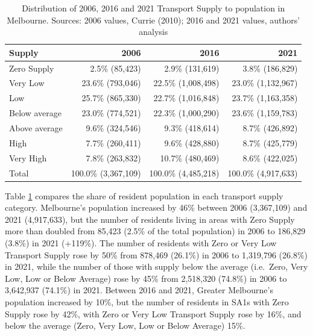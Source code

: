 \documentclass[preprint, 3p,
authoryear]{elsarticle} %
\begin{document}
\begin{table}

\caption{\label{tab:Greater_Melbourne_CCDs_SA1_population}Distribution of 2006, 2016 and 2021 Transport Supply to population in Melbourne. Sources: 2006 values, Currie (2010); 2016 and 2021 values, authors' analysis}
\centering
\begin{tabular}[t]{l|r|r|r}
\hline
Supply & 2006 & 2016 & 2021\\
\hline
Zero Supply & 2.5\%    (85,423) & 2.9\%   (131,619) & 3.8\%   (186,829)\\
\hline
Very Low & 23.6\%   (793,046) & 22.5\% (1,008,498) & 23.0\% (1,132,967)\\
\hline
Low & 25.7\%   (865,330) & 22.7\% (1,016,848) & 23.7\% (1,163,358)\\
\hline
Below average & 23.0\%   (774,521) & 22.3\% (1,000,290) & 23.6\% (1,159,783)\\
\hline
Above average & 9.6\%   (324,546) & 9.3\%   (418,614) & 8.7\%   (426,892)\\
\hline
High & 7.7\%   (260,411) & 9.6\%   (428,880) & 8.7\%   (425,779)\\
\hline
Very High & 7.8\%   (263,832) & 10.7\%   (480,469) & 8.6\%   (422,025)\\
\hline
Total & 100.0\% (3,367,109) & 100.0\% (4,485,218) & 100.0\% (4,917,633)\\
\hline
\end{tabular}
\end{table}

Table \ref{tab:Greater_Melbourne_CCDs_SA1_population} compares the share
of resident population in each transport supply category. Melbourne's
population increased by 46\% between 2006 (3,367,109) and 2021
(4,917,633), but the number of residents living in areas with Zero
Supply more than doubled from 85,423 (2.5\% of the total population) in
2006 to 186,829 (3.8\%) in 2021 (+119\%). The number of residents with
Zero or Very Low Transport Supply rose by 50\% from 878,469 (26.1\%) in
2006 to 1,319,796 (26.8\%) in 2021, while the number of those with
supply below the average (i.e.~Zero, Very Low, Low or Below Average)
rose by 45\% from 2,518,320 (74.8\%) in 2006 to 3,642,937 (74.1\%) in
2021. Between 2016 and 2021, Greater Melbourne's population increased by
10\%, but the number of residents in SA1s with Zero Supply rose by 42\%,
with Zero or Very Low Transport Supply rose by 16\%, and below the
average (Zero, Very Low, Low or Below Average) 15\%.
\end{document}
